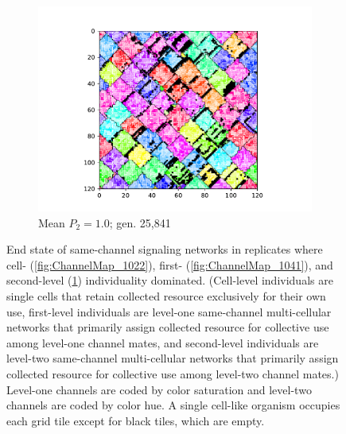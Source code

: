\begin{figure}[!htbp]
\begin{center}
\begin{subfigure}[b]{0.80\columnwidth}
  \includegraphics[width=\columnwidth,trim={2.5cm 0.5cm 2.5cm 1cm},clip]{img/ChannelMap_1008_update19500000}
  \caption{Mean $P_2 = 1.0$; gen. 25,841}
  \label{fig:ChannelMap_1008}
\end{subfigure}

\caption{
End state of same-channel signaling networks in replicates where cell- (\ref{fig:ChannelMap_1022}), first- (\ref{fig:ChannelMap_1041}), and second-level (\ref{fig:ChannelMap_1008}) individuality dominated.
(Cell-level individuals are single cells that retain collected resource exclusively for their own use, first-level individuals are level-one same-channel multi-cellular networks that primarily assign collected resource for collective use among level-one channel mates, and second-level individuals are level-two same-channel multi-cellular networks that primarily assign collected resource for collective use among level-two channel mates.)
Level-one channels are coded by color saturation and level-two channels are coded by color hue.
A single cell-like organism occupies each grid tile except for black tiles, which are empty.
}
\label{fig:outcome_grids}
\end{center}
\end{figure}
